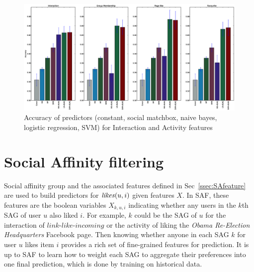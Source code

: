 
\begin{figure}[tbp!]
\hspace{-6mm}\includegraphics[width=190mm]{data/plots/accuracy/accuracyNew.eps}
\caption{ Accuracy of predictors (constant, social matchbox, naive bayes, logistic regression, SVM) for Interaction and Activity  features }
\label{Fig1}
\end{figure}

\section{Social Affinity filtering}

Social affinity group and the associated features defined in Sec~\ref{ssec:SAfeature} 
are used to build predictors for $\likes(u,i)$ given features $X$.
In SAF, these features are the boolean
variables $X_{k,u,i}$ indicating whether any users in the $k$th SAG of
user $u$ also liked $i$.  For example, $k$ could be the SAG of $u$ for
the interaction of $\textit{link-like-incoming}$ or the activity of
liking the {\em Obama Re-Election Headquarters} Facebook page.  Then knowing whether
anyone in each SAG $k$ for user $u$ likes item $i$ provides a rich set
of fine-grained features for prediction.  It is up to SAF to learn how
to weight each SAG to aggregate their preferences into one final
prediction, which is done by training on historical data.

